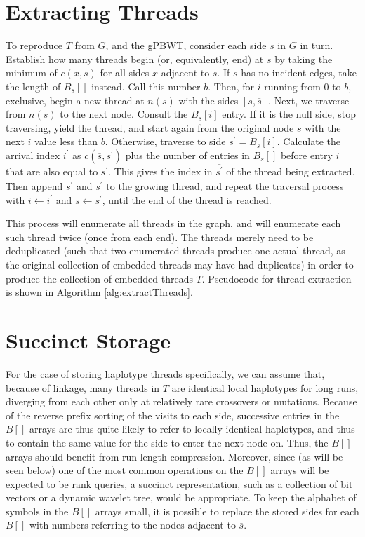 \section{Extracting Threads}

To reproduce $T$ from $G$, and the gPBWT, consider each side $s$ in $G$ in turn. Establish how many threads begin (or, equivalently, end) at $s$ by taking the minimum of $c(x, s)$ for all sides $x$ adjacent to $s$. If $s$ has no incident edges, take the length of $B_s[]$ instead. Call this number $b$. Then, for $i$ running from 0 to $b$, exclusive, begin a new thread at $n(s)$ with the sides $[s, \overline{s}]$. Next, we traverse from $n(s)$ to the next node. Consult the $B_s[i]$ entry. If it is the null side, stop traversing, yield the thread, and start again from the original node $s$ with the next $i$ value less than $b$. Otherwise, traverse to side $s^\prime = B_s[i]$. Calculate the arrival index $i^\prime$ as $c(\overline{s}, s^\prime)$ plus the number of entries in $B_s[]$ before entry $i$ that are also equal to $s^\prime$. This gives the index in $\overline{s^\prime}$ of the thread being extracted.  Then append $s^\prime$ and $\overline{s^\prime}$ to the growing thread, and repeat the traversal process with $i \leftarrow i^\prime$ and $s \leftarrow s^\prime$, until the end of the thread is reached. 

This process will enumerate all threads in the graph, and will enumerate each such thread twice (once from each end). The threads merely need to be deduplicated (such that two enumerated threads produce one actual thread, as the original collection of embedded threads may have had duplicates) in order to produce the collection of embedded threads $T$. Pseudocode for thread extraction is shown in Algorithm \ref{alg:extractThreads}.



\section{Succinct Storage}

For the case of storing haplotype threads specifically, we can assume that, because of linkage, many threads in $T$ are identical local haplotypes for long runs, diverging from each other only at relatively rare crossovers or mutations. Because of the reverse prefix sorting of the visits to each side, successive entries in the $B[]$ arrays are thus quite likely to refer to locally identical haplotypes, and thus to contain the same value for the side to enter the next node on. Thus, the $B[]$ arrays should benefit from run-length compression. Moreover, since (as will be seen below) one of the most common operations on the $B[]$ arrays will be expected to be rank queries, a succinct representation, such as a collection of bit vectors or a dynamic wavelet tree, would be appropriate. To keep the alphabet of symbols in the $B[]$ arrays small, it is possible to replace the stored sides for each $B[]$ with numbers referring to the nodes adjacent to $\overline{s}$.

